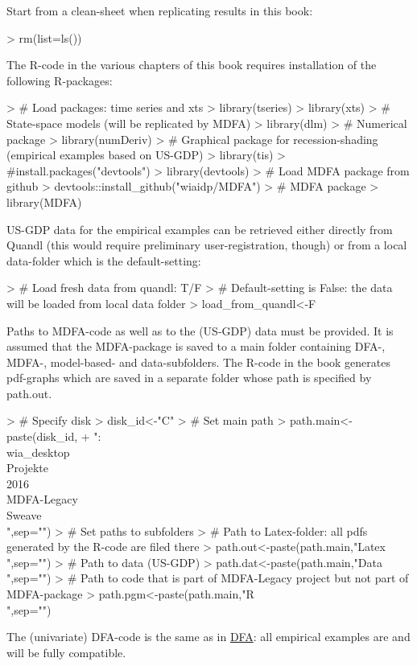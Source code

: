 \documentclass[a4paper]{book}
\begin{document}
Start from a clean-sheet when replicating results in this book:
\begin{Schunk}
\begin{Sinput}
> rm(list=ls())
\end{Sinput}
\end{Schunk}
The R-code in the various chapters of this book requires installation of the following R-packages:
\begin{Schunk}
\begin{Sinput}
> # Load packages: time series and xts
> library(tseries)
> library(xts)
> # State-space models (will be replicated by MDFA) 
> library(dlm)
> # Numerical package 
> library(numDeriv)
> # Graphical package for recession-shading (empirical examples based on US-GDP)
> library(tis) 
> #install.packages("devtools")
> library(devtools)
> # Load MDFA package from github
> devtools::install_github("wiaidp/MDFA")
> # MDFA package
> library(MDFA) 
\end{Sinput}
\end{Schunk}
US-GDP data for the empirical examples can be retrieved either directly from Quandl (this would require preliminary user-registration, though) or from a local data-folder which is the default-setting:
\begin{Schunk}
\begin{Sinput}
> # Load fresh data from quandl: T/F
> #   Default-setting is False: the data will be loaded from local data folder
> load_from_quandl<-F
\end{Sinput}
\end{Schunk}
Paths to MDFA-code as well as to the (US-GDP) data must be provided. It is assumed that the MDFA-package is saved to a main folder containing DFA-, MDFA-, model-based- and data-subfolders. The R-code in the book generates pdf-graphs which are saved in a separate folder whose path is specified by path.out.
\begin{Schunk}
\begin{Sinput}
> # Specify disk
> disk_id<-"C"
> # Set main path
> path.main<-paste(disk_id,
+       ":\\wia_desktop\\Projekte\\2016\\MDFA-Legacy\\Sweave\\",sep="")
> # Set paths to subfolders
>   # Path to Latex-folder: all pdfs generated by the R-code are filed there
> path.out<-paste(path.main,"Latex\\",sep="")
>   # Path to data (US-GDP)
> path.dat<-paste(path.main,"Data\\",sep="")
>   # Path to code that is part of MDFA-Legacy project but not part of MDFA-package 
> path.pgm<-paste(path.main,"R\\",sep="")
\end{Sinput}
\end{Schunk}
The (univariate) DFA-code is the same as in \href{http://blog.zhaw.ch/sef/files/2014/10/DFA.pdf}{DFA}: all  empirical examples are and will be fully compatible. 
\end{document}

